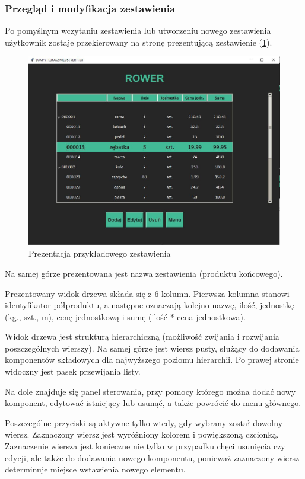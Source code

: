 \documentclass[12pt,twoside]{article}
\begin{document}
\subsubsection*{Przegląd i modyfikacja zestawienia}
Po pomyślnym wczytaniu zestawienia lub utworzeniu nowego zestawienia użytkownik zostaje przekierowany na stronę prezentującą zestawienie (\ref{fig:app:bom_presentation}).

\begin{figure}[h]
	\centering
	\includegraphics[width=\textwidth]{figures/app/bom_presentation.jpg}
	\caption{Prezentacja przykładowego zestawienia}
\label{fig:app:bom_presentation}
\end{figure}

Na samej górze prezentowana jest nazwa zestawienia (produktu końcowego).

Prezentowany widok drzewa składa się z 6 kolumn. Pierwsza kolumna stanowi identyfikator półproduktu, a następne oznaczają kolejno nazwę, ilość, jednostkę (kg., szt., m), cenę jednostkową i sumę (ilość * cena jednostkowa).

Widok drzewa jest strukturą hierarchiczną (możliwość zwijania i rozwijania poszczególnych wierszy). Na samej górze jest wiersz pusty, służący do dodawania komponentów składowych dla najwyższego poziomu hierarchii. Po prawej stronie widoczny jest pasek przewijania listy.

Na dole znajduje się panel sterowania, przy pomocy którego można dodać nowy komponent, edytować istniejący lub usunąć, a także powrócić do menu głównego.

Poszczególne przyciski są aktywne tylko wtedy, gdy wybrany został dowolny wiersz. Zaznaczony wiersz jest wyróżniony kolorem i powiększoną czcionką. Zaznaczenie wiersza jest konieczne nie tylko w przypadku chęci usunięcia czy edycji, ale także do dodawania nowego komponentu, ponieważ zaznaczony wiersz determinuje miejsce wstawienia nowego elementu.
\end{document}
